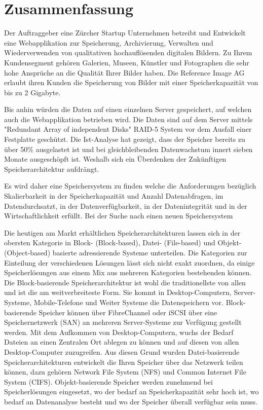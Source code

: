 
\cleardoublepage
\chapter{Zusammenfassung}

Der Auftraggeber eine Zürcher Startup Unternehmen betreibt und Entwickelt eine Webapplikation zur Speicherung, Archivierung, Verwalten und Wiederverwenden von qualitativen hochauflösenden digitalen Bildern. Zu Ihrem Kundensegment gehören Galerien, Museen, Künstler und Fotographen die sehr hohe Ansprüche an die Qualität Ihrer Bilder haben. 
Die Reference Image AG erlaubt ihren Kunden die Speicherung von Bilder mit einer Speicherkapazität von bis zu 2 Gigabyte.

Bis anhin würden die Daten auf einen einzelnen Server gespeichert, auf welchen auch die Webapplikation betrieben wird. Die Daten sind auf dem Server mittels "Redundant Array of independent Disks" RAID-5 System vor dem Ausfall einer Festplatte geschützt. Die Ist-Analyse hat gezeigt, dass der Speicher bereits zu über 50\% ausgelastet ist und bei gleichbleibenden Datenwachstum innert sieben Monate ausgeschöpft ist. Weshalb sich ein Überdenken der Zukünftigen Speicherarchitektur aufdrängt.

Es wird daher eine Speichersystem zu finden welche die Anforderungen bezüglich Skalierbarkeit in der Speicherkapazität und Anzahl Datenabfragen, im Datendurchsatzt, in der Datenverfügbarkeit, in der Datenintegrität und in der Wirtschaftlichkeit erfüllt. Bei der Suche nach einen neuen Speichersystem 

Die heutigen am Markt erhältlichen Speicherarchitekturen lassen sich in der obersten Kategorie in Block- (Block-based), Datei- (File-based) und Objekt- (Object-based) basierte adressierende Systeme unterteilen. Die Kategorien zur Einteilung der verschiedenen Lösungen lässt sich nicht exakt zuordnen, da einige Speicherlösungen aus einem Mix aus mehreren Kategorien bestehenden können. Die Block-basierende Speicherarchitektur ist wohl die traditionellste von allen und ist die am weitverbreiteste Form. Sie kommt in Desktop-Computern, Server-Systeme, Mobile-Telefone und Weiter Systeme die Datenspeichern vor. Block-basierende Speicher können über FibreChannel oder iSCSI über eine Speichernetzwerk (SAN) an mehreren Server-Systeme zur Verfügung gestellt werden. Mit dem Aufkommen von Desktop-Computern, wuchs der Bedarf Dateien an einen Zentralen Ort ablegen zu können und auf diesen von allen Desktop-Computer zuzugreifen. Aus diesen Grund wurden Datei-basierende Speicherarchitekturen entwickelt die Ihren Speicher über das Netzwerk teilen können, dazu gehören Network File System (NFS) und Common Internet File System (CIFS). Objekt-basierende Speicher werden zunehmend bei Speicherlösungen eingesetzt,  wo der bedarf an Speicherkapazität sehr hoch ist, wo bedarf an Datenanalyse besteht und wo der Speicher überall verfügbar sein muss.


